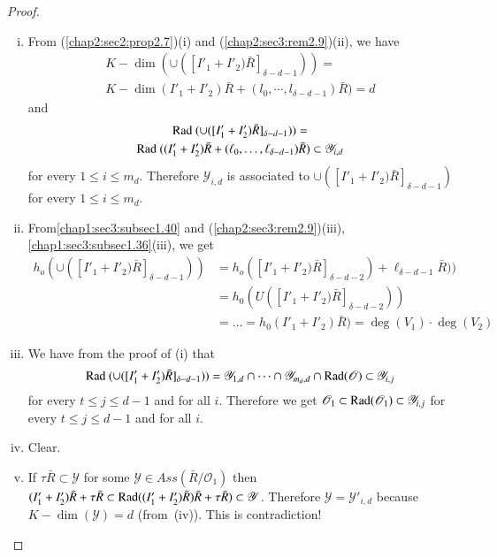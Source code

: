  \begin{proof}
\begin{enumerate}[(i)]
 \item From (\ref{chap2:sec2:prop2.7})(i) and
   (\ref{chap2:sec3:rem2.9})(ii), we have  
   \begin{multline*}
   K-\dim (\cup
   ([I'_1+I'_2)\bar{R}]_{\delta-d-1}))=\\
   K-\dim
   (I'_1+I'_2)\bar{R}+(l_0,\cdots, l_{\delta -d-1})\bar{R})=d
   \end{multline*}
   and   
   \begin{multline*}
   \operatorname{Rad} ~ (\cup ([I'_1+I'_2)\bar{R}]_{\delta-d-1}))=\\
   \operatorname{Rad} ~
   ((I'_1+I'_2)\bar{R}+(\ell_0,\ldots, \ell_{\delta
   -d-1})\bar{R})\subset \mathscr{Y}_{i,d}
   \end{multline*}
   for every $1 \leq i \leq
   m_d$. Therefore $\mathscr{Y}_{i,d}$ is associated to $\cup
   ([I'_1+I'_2)\bar{R}]_{\delta-d-1})$ for every $1 \leq i \leq m_d$. 
\item From\pageoriginale \ref{chap1:sec3:subsec1.40} and
  (\ref{chap2:sec3:rem2.9})(iii), \ref{chap1:sec3:subsec1.36}(iii), we get 
  \begin{align*}
    h_o (\cup ([I'_1+I'_2)\bar{R}]_{\delta-d-1}))& =h_o
  ([I'_1+I'_2)\bar{R}]_{\delta-d-2})+\ell_{\delta-d-1}\bar{R}))\\
    & =h_0 (U([I'_1+I'_2)\bar{R}]_{\delta-d-2}))\\
    & = \ldots=h_0
  (I'_1+I'_2)\bar{R})=\deg (V_1)\cdot\deg (V_2) 
  \end{align*}
\item We have from the proof of (i) that
  $$
  \operatorname{Rad} ~ (\cup([I'_1+I'_2)\bar{R}]_{\delta-d-1}))=\mathscr{Y}_{1,d}\cap
  \cdots \cap \mathscr{Y}_{m_d,d} \cap \operatorname{Rad}  (\mathscr{O})\subset
  \mathscr{Y}_{i, j}
  $$ 
  for every $t \leq j \leq d-1$ and for all
  $i$. Therefore we get $\mathscr{O}_1 \subset \operatorname{Rad} 
  (\mathscr{O}_1)\subset \mathscr{Y}_{i,j}$ for every $t \leq j \leq
  d-1$ and for all $i$. 
\item Clear.
\item If $\tau \bar{R} \subset \mathscr{Y}$ for some
  $\mathscr{Y}\in  Ass (\bar{R}/\mathscr{O}_1)$ then
  $(I'_1+I'_2)\bar{R}+\tau \bar{R}\subset \operatorname{Rad} 
  ((I'_1+I'_2)\bar{R})\bar{R}+\tau \bar{R})\subset
  \mathscr{Y}$. Therefore $\mathscr{Y}=\mathscr{Y}'_{i,d}$ because
  $K-\dim (\mathscr{Y})=d$ (from~(iv)). This is contradiction!  
\end{enumerate}
\end{proof}


